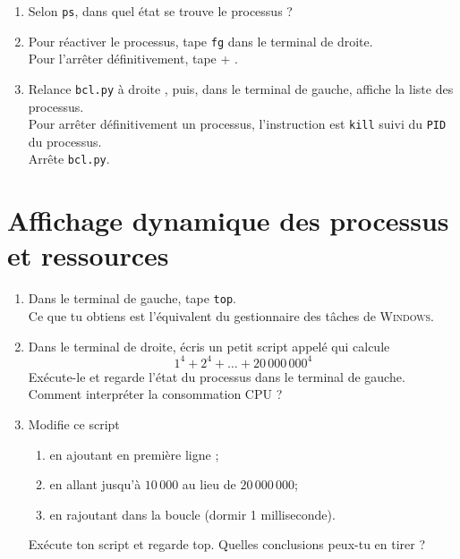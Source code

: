 \documentclass[a4paper,12pt,french]{book}
\begin{document}
\begin{enumerate}[\bfseries 1.]
    \item Selon \texttt{ps}, dans quel état se trouve le processus ?\\

    \item Pour réactiver le processus, tape \texttt{fg} dans le terminal de droite.\\
            Pour l'arrêter définitivement, tape  + .\\

    \item Relance \texttt{bcl.py} à droite , puis, dans le terminal de gauche, affiche la liste des processus.\\
          Pour arrêter définitivement un processus, l'instruction est \texttt{kill} suivi du \texttt{PID} du processus.\\
          Arrête \texttt{bcl.py}.
\end{enumerate}
\newpage
\section*{Affichage dynamique des processus et ressources}
\begin{enumerate}[\bfseries 1.]
	\item Dans le terminal de gauche, tape \texttt{top}.\\
     Ce que tu obtiens est l'équivalent du gestionnaire des tâches de \textsc{Windows}.\\

     \item Dans le terminal de droite, écris un petit script appelé  qui calcule
     $$1^4+2^4+\ldots+20\,000\,000^4$$
     Exécute-le et regarde l'état du processus dans le terminal de gauche. Comment interpréter la consommation CPU ?\\

     \item Modifie ce script
     \begin{enumerate}[--]
     	\item en ajoutant en première ligne ;
         \item en allant jusqu'à $10\,000$ au lieu de $20\,000\,000$;
         \item en rajoutant dans la boucle  (dormir 1 milliseconde).
     \end{enumerate}
     Exécute ton script et regarde top. Quelles conclusions peux-tu en tirer ?
\end{enumerate}
\end{document}
